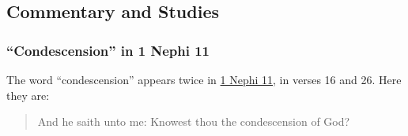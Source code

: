 	
	
	
	
\subsection{Commentary and Studies} %
	\label{CONDESCENSION-COMMENTARY}

	
		
	\subsubsection{``Condescension'' in 1 Nephi 11}
		\label{CONDESCENSION-1nephi}
		
		The word ``condescension'' appears twice in \hyperref[1NEPHI-11]{1 Nephi 11}, in verses 16 and 26. Here they are:
		
		\begin{quote}
			And he saith unto me: Knowest thou the condescension of God?
		\end{quote}
		
